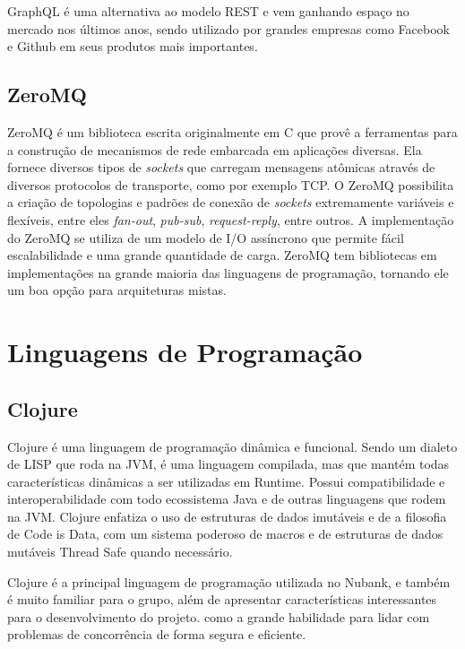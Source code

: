             GraphQL é uma alternativa ao modelo REST e vem ganhando espaço no mercado nos últimos anos, sendo utilizado por grandes empresas como Facebook e Github em seus produtos mais importantes.
    
        \subsection{ZeroMQ} 
        
        ZeroMQ é um biblioteca escrita originalmente em C que provê a ferramentas para a construção de mecanismos de rede embarcada em aplicações diversas. Ela fornece diversos tipos de \textit{sockets} que carregam mensagens atômicas através de diversos protocolos de transporte, como por exemplo TCP. O ZeroMQ possibilita a criação de topologias e padrões de conexão de \textit{sockets} extremamente variáveis e flexíveis, entre eles \textit{fan-out}, \textit{pub-sub}, \textit{request-reply}, entre outros. A implementação do ZeroMQ se utiliza de um modelo de I/O assíncrono que permite fácil escalabilidade e uma grande quantidade de carga. ZeroMQ tem bibliotecas em implementações na grande maioria das linguagens de programação, tornando ele um boa opção para arquiteturas mistas.\cite{zeromqguide}
        
    \section{Linguagens de Programação}
    	\subsection{Clojure}
    	    Clojure é uma linguagem de programação dinâmica e funcional. Sendo um dialeto de LISP que roda na JVM, é uma linguagem compilada, mas que mantém todas características dinâmicas a ser utilizadas em Runtime. Possui compatibilidade e interoperabilidade com todo ecossistema Java e de outras linguagens que rodem na JVM. Clojure enfatiza o uso de estruturas de dados imutáveis e de a filosofia de Code is Data, com um sistema poderoso de macros e de estruturas de dados mutáveis Thread Safe quando necessário. \cite{clojurerationale}
	
    	    Clojure é a principal linguagem de programação utilizada no Nubank, e também é muito familiar para o grupo, além de apresentar características interessantes para o desenvolvimento do projeto. como a grande habilidade para lidar com problemas de concorrência de forma segura e eficiente.
	
